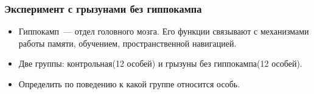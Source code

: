 \documentclass[smaller]{beamer}
\begin{document}
\begin{frame}
  \frametitle{Эксперимент с грызунами без гиппокампа}
  \begin{itemize}
   \item Гиппокамп~--- отдел головного мозга. Его функции 
связывают с механизмами работы памяти, обучением, пространственной
навигацией.
   \item Две группы: контрольная(12 особей) и грызуны без гиппокампа(12 особей).
   \item Определить по поведению к какой группе относится особь.
  \end{itemize}
\begin{figure}[H]
\end{figure}
\end{frame}
\end{document}
